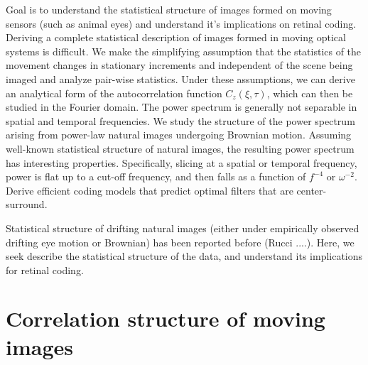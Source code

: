 \documentclass[12pt]{article}
\newcommand{\afbcomment}[1]{\textcolor{alexcolor}{#1}}
\begin{document}
Goal is to understand the statistical structure of images formed on moving sensors (such as animal eyes) and understand it's implications on retinal coding. Deriving a complete statistical description of images formed in moving optical systems is difficult. We make the simplifying assumption that the statistics of the movement changes in stationary increments and independent of the scene being imaged and analyze pair-wise statistics.
Under these assumptions, we can derive an analytical form of the autocorrelation function $C_z(\xi,\tau)$, which can then be studied in the Fourier domain. 
The power spectrum is generally not separable in spatial and temporal frequencies. 
We study the structure of the power spectrum arising from power-law natural images undergoing Brownian motion.
Assuming well-known statistical structure of natural images, the resulting power spectrum has interesting properties. 
Specifically, slicing at a spatial or temporal frequency, power is flat up to a cut-off frequency, and then falls as a function of $f^{-4}$ or $\omega^{-2}$. 
Derive efficient coding models that predict optimal filters that are center-surround. 

Statistical structure of drifting natural images (either under empirically observed drifting eye motion or Brownian) has been reported before (Rucci ....). Here, we seek describe the statistical structure of the data, and understand its implications for retinal coding. 

\section{Correlation structure of moving images}
\end{document}
